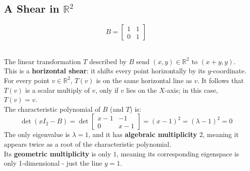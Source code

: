 \documentclass[a4paper, 9pt]{extarticle}
\begin{document}
\subsection{A Shear in $\mathbb{R}^2$}
\begin{minipage}{0.3\textwidth}
  \begin{center}
    $$
      B = \begin{bmatrix}
        1 & 1 \\
        0 & 1
      \end{bmatrix}
    $$
  \end{center}
\end{minipage}
\begin{minipage}{0.7\textwidth}
  \begin{center}
  \end{center}
\end{minipage} \\[2ex]
The linear transformation $T$ described by $B$ send $(x,y) \in \mathbb{R}^2$ to $(x+y, y)$. This is a \textbf{horizontal shear}: it shifts every point horizontally by its $y$-coordinate. \\[2ex]
For every point $v \in \mathbb{R}^2$, $T(v)$ is on the same horizontal line as $v$. It follows that $T(v)$ is a scalar multiply of $v$, only if $v$ lies on the $X$-axis; in this case, $T(v) = v$. \\[2ex]
The characteristic polynomial of $B$ (and $T$) is:
$$
  \det(xI_2 - B) = \det\begin{bmatrix}
    x-1 & -1  \\
    0   & x-1
  \end{bmatrix} = (x-1)^2 = (\lambda - 1)^2 = 0
$$
The only eigenvalue is $\lambda = 1$, and it has \textbf{algebraic multiplicity} $2$, meaning it appears twice as a root of the characteristic polynomial. \\[2ex]
Its \textbf{geometric multiplicity} is only $1$, meaning its corresponding eigenspace is only 1-dimensional - just the line $y = 1$.
\end{document}
